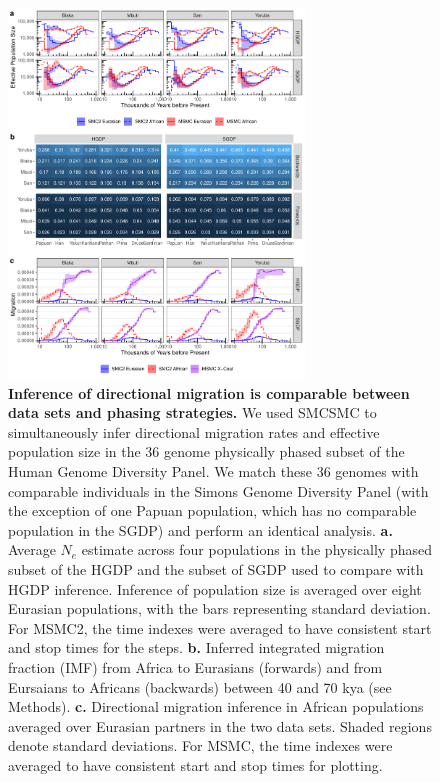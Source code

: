 \begin{figure}
	\centering
	\includegraphics[width=0.7\textwidth]{plot/both_figure.pdf}
	\caption[Migration inference is comparable between phasing strategies]{{\bf Inference of directional migration is comparable between data sets and phasing strategies.} We used SMCSMC to simultaneously infer directional migration rates and effective population size in the 36 genome physically phased subset of the Human Genome Diversity Panel. We match these 36 genomes with comparable individuals in the Simons Genome Diversity Panel (with the exception of one Papuan population, which has no comparable population in the SGDP) and perform an identical analysis. {\bf a.} Average $N_e$ estimate across four populations in the physically phased subset of the HGDP and the subset of SGDP used to compare with HGDP inference. Inference of population size is averaged over eight Eurasian populations, with the bars representing standard deviation. For MSMC2, the time indexes were averaged to have consistent start and stop times for the steps. {\bf b.} Inferred integrated migration fraction (IMF) from Africa to Eurasians (forwards) and from Eursaians to Africans (backwards) between 40 and 70 kya (see Methods). {\bf c.} Directional migration inference in African populations averaged over Eurasian partners in the two data sets. Shaded regions denote standard deviations. For MSMC, the time indexes were averaged to have consistent start and stop times for plotting.}
	\label{fig:both}
\end{figure}

